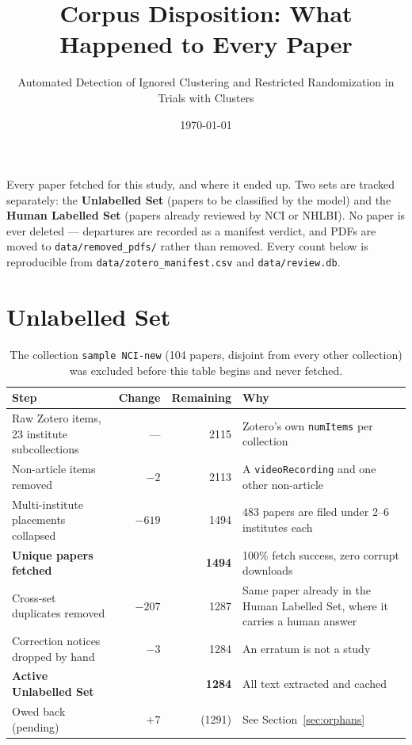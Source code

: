\documentclass[11pt]{article}
\title{Corpus Disposition: What Happened to Every Paper}
\author{Automated Detection of Ignored Clustering and Restricted Randomization in Trials with Clusters}
\date{\today}
\begin{document}
\maketitle
\vspace{-2em}

\noindent
Every paper fetched for this study, and where it ended up. Two sets are tracked separately: the
\textbf{Unlabelled Set} (papers to be classified by the model) and the \textbf{Human Labelled Set}
(papers already reviewed by NCI or NHLBI). No paper is ever deleted --- departures are recorded as a
manifest verdict, and PDFs are moved to \texttt{data/removed\_pdfs/} rather than removed.
Every count below is reproducible from \texttt{data/zotero\_manifest.csv} and \texttt{data/review.db}.

\section{Unlabelled Set}

\begin{table}[h]
\centering
\begin{tabular}{lrrl}
\toprule
\textbf{Step} & \textbf{Change} & \textbf{Remaining} & \textbf{Why} \\
\midrule
Raw Zotero items, 23 institute subcollections & --- & 2115 & Zotero's own \texttt{numItems} per collection \\
Non-article items removed & $-2$ & 2113 & A \texttt{videoRecording} and one other non-article \\
Multi-institute placements collapsed & $-619$ & 1494 & 483 papers are filed under 2--6 institutes each \\
\midrule
\textbf{Unique papers fetched} & & \textbf{1494} & 100\% fetch success, zero corrupt downloads \\
\midrule
Cross-set duplicates removed & $-207$ & 1287 & Same paper already in the Human Labelled Set, where it carries a human answer \\
Correction notices dropped by hand & $-3$ & 1284 & An erratum is not a study \\
\midrule
\textbf{Active Unlabelled Set} & & \textbf{1284} & All text extracted and cached \\
\midrule
Owed back (pending) & $+7$ & (1291) & See Section~\ref{sec:orphans} \\
\bottomrule
\end{tabular}
\caption{The collection \texttt{sample NCI-new} (104 papers, disjoint from every other collection)
was excluded before this table begins and never fetched.}
\end{table}
\end{document}
